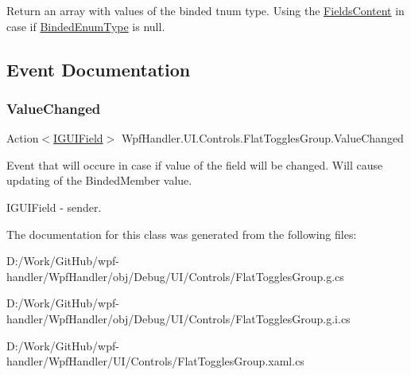 Return an array with values of the binded tnum type. Using the \mbox{\hyperlink{class_wpf_handler_1_1_u_i_1_1_controls_1_1_flat_toggles_group_a48c85f0f2ca803d28b95877dbc0122f0}{Fields\+Content}} in case if \mbox{\hyperlink{class_wpf_handler_1_1_u_i_1_1_controls_1_1_flat_toggles_group_abb4f90b5eace0651db2af6f293d312d1}{Binded\+Enum\+Type}} is null. 



\subsection{Event Documentation}
\mbox{\label{class_wpf_handler_1_1_u_i_1_1_controls_1_1_flat_toggles_group_aa00366c7443bee714b067ee15186de82}} 
\subsubsection{\texorpdfstring{Value\+Changed}{ValueChanged}}
{\footnotesize\ttfamily Action$<$\mbox{\hyperlink{interface_wpf_handler_1_1_u_i_1_1_auto_layout_1_1_i_g_u_i_field}{I\+G\+U\+I\+Field}}$>$ Wpf\+Handler.\+U\+I.\+Controls.\+Flat\+Toggles\+Group.\+Value\+Changed}



Event that will occure in case if value of the field will be changed. Will cause updating of the Binded\+Member value. 

I\+G\+U\+I\+Field -\/ sender. 

The documentation for this class was generated from the following files\+:\begin{DoxyCompactItemize}
\item 
D\+:/\+Work/\+Git\+Hub/wpf-\/handler/\+Wpf\+Handler/obj/\+Debug/\+U\+I/\+Controls/Flat\+Toggles\+Group.\+g.\+cs\item 
D\+:/\+Work/\+Git\+Hub/wpf-\/handler/\+Wpf\+Handler/obj/\+Debug/\+U\+I/\+Controls/Flat\+Toggles\+Group.\+g.\+i.\+cs\item 
D\+:/\+Work/\+Git\+Hub/wpf-\/handler/\+Wpf\+Handler/\+U\+I/\+Controls/Flat\+Toggles\+Group.\+xaml.\+cs\end{DoxyCompactItemize}
